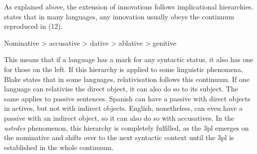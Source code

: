 \documentclass[output=paper]{LSP/langsci}
\begin{document}
\begin{table}
\label{tab:10}
\caption{Extension of the innovative 3pl in the ustedes phenomenon} 
\end{table}

As explained above, the extension of innovations follows implicational hierarchies. \citet{blake_case_2004} states that in many languages, any innovation usually obeys the continuum reproduced in (12).

\begin{exe}
\ex Nominative {\textgreater} accusative {\textgreater} dative {\textgreater} ablative {\textgreater} genitive
\end{exe}

This means that if a language has a mark for any syntactic status, it also has one for those on the left. If this hierarchy is applied to some linguistic phenomena, Blake states that in some languages, relativisation follows this continuum. If one language can relativise the direct object, it can also do so to its subject. The same applies to passive sentences. Spanish can have a passive with direct objects in actives, but not with indirect objects. English, nonetheless, can even have a passive with an indirect object, so it can also do so with accusatives. In the \textit{ustedes} phenomenon, this hierarchy is completely fulfilled, as the 3pl emerges on the nominative and shifts over to the next syntactic context until the 3pl is established in the whole continuum.
\end{document}
